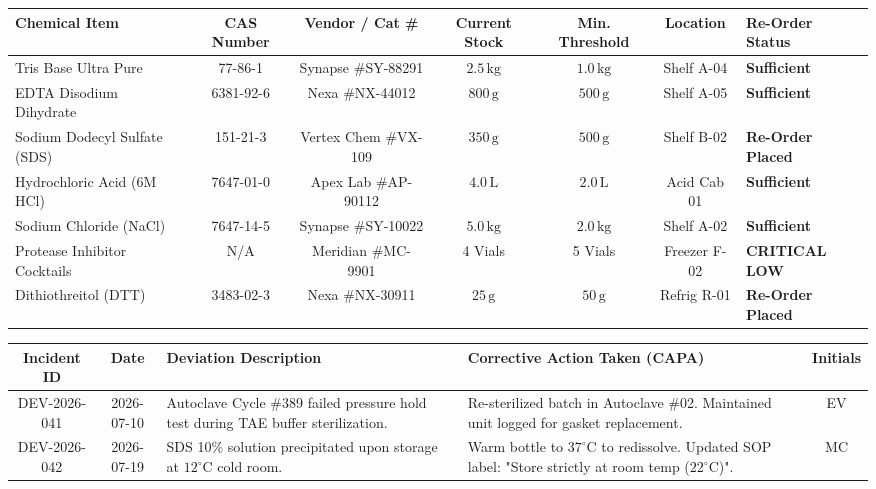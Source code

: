 \documentclass[10pt,a4paper]{article}
\begin{document}
{\scriptsize
\begin{tabularx}{\textwidth}{@{}Xccccc>{\centering\arraybackslash}X@{}}
  \toprule
  \rowcolor{labnavy}
  \color{white}\textbf{Chemical Item} & \color{white}\textbf{CAS Number} & \color{white}\textbf{Vendor / Cat \#} & \color{white}\textbf{Current Stock} & \color{white}\textbf{Min. Threshold} & \color{white}\textbf{Location} & \color{white}\textbf{Re-Order Status} \\
  \midrule
  Tris Base Ultra Pure & 77-86-1 & Synapse \#SY-88291 & $2.5\,\text{kg}$ & $1.0\,\text{kg}$ & Shelf A-04 & \color{labgreen}\textbf{Sufficient} \\
  EDTA Disodium Dihydrate & 6381-92-6 & Nexa \#NX-44012 & $800\,\text{g}$ & $500\,\text{g}$ & Shelf A-05 & \color{labgreen}\textbf{Sufficient} \\
  Sodium Dodecyl Sulfate (SDS) & 151-21-3 & Vertex Chem \#VX-109 & $350\,\text{g}$ & $500\,\text{g}$ & Shelf B-02 & \color{labamber}\textbf{Re-Order Placed} \\
  Hydrochloric Acid (6M HCl) & 7647-01-0 & Apex Lab \#AP-90112 & $4.0\,\text{L}$ & $2.0\,\text{L}$ & Acid Cab 01 & \color{labgreen}\textbf{Sufficient} \\
  Sodium Chloride (NaCl) & 7647-14-5 & Synapse \#SY-10022 & $5.0\,\text{kg}$ & $2.0\,\text{kg}$ & Shelf A-02 & \color{labgreen}\textbf{Sufficient} \\
  Protease Inhibitor Cocktails & N/A & Meridian \#MC-9901 & 4 Vials & 5 Vials & Freezer F-02 & \color{labred}\textbf{CRITICAL LOW} \\
  Dithiothreitol (DTT) & 3483-02-3 & Nexa \#NX-30911 & $25\,\text{g}$ & $50\,\text{g}$ & Refrig R-01 & \color{labamber}\textbf{Re-Order Placed} \\
  \bottomrule
\end{tabularx}
}

\vspace{6pt}

\begin{tcolorbox}[labcard, title={\small\bfseries\color{labred}\faExclamationTriangle\ SECTION 6: DEVIATIONS, NON-CONFORMANCE \& CORRECTIVE ACTIONS (CAPA)}, colback=white, colframe=labred]
  \scriptsize
  \begin{tabularx}{\textwidth}{@{}ccX>{\raggedright\arraybackslash}Xc@{}}
    \toprule
    \rowcolor{labred!10}
    \textbf{Incident ID} & \textbf{Date} & \textbf{Deviation Description} & \textbf{Corrective Action Taken (CAPA)} & \textbf{Initials} \\
    \midrule
    DEV-2026-041 & 2026-07-10 & Autoclave Cycle \#389 failed pressure hold test during TAE buffer sterilization. & Re-sterilized batch in Autoclave \#02. Maintained unit logged for gasket replacement. & EV \\
    DEV-2026-042 & 2026-07-19 & SDS 10\% solution precipitated upon storage at $12^\circ\text{C}$ cold room. & Warm bottle to $37^\circ\text{C}$ to redissolve. Updated SOP label: "Store strictly at room temp ($22^\circ\text{C}$)". & MC \\
    \bottomrule
  \end{tabularx}
\end{tcolorbox}
\end{document}
